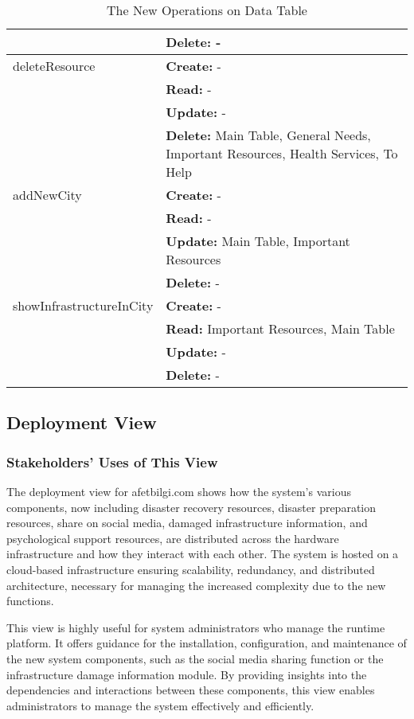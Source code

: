 \documentclass[12pt, letterpaper]{article}
\begin{document}
\begin{table}[H]
\begin{tabularx}{\textwidth}{|X|p{10cm}|}
     & \textbf{Delete:} - \\
\hline
     deleteResource & \textbf{Create:} - \\
     & \textbf{Read:} - \\
     & \textbf{Update:} - \\
     & \textbf{Delete:} Main Table, General Needs, Important Resources, Health Services, To Help \\
\hline
     addNewCity & \textbf{Create:} - \\
     & \textbf{Read:} - \\
     & \textbf{Update:} Main Table, Important Resources \\
     & \textbf{Delete:} - \\
\hline
     showInfrastructureInCity & \textbf{Create:} - \\
     & \textbf{Read:} Important Resources, Main Table \\
     & \textbf{Update:} - \\
     & \textbf{Delete:} - \\
\hline

\end{tabularx}
\caption{The New Operations on Data Table}
\label{tab:opOnData}
\end{table}

\newpage

\subsection{Deployment View}
\subsubsection{Stakeholders' Uses of This View}
The deployment view for afetbilgi.com shows how the system's various components, now including disaster recovery resources, disaster preparation resources, share on social media, damaged infrastructure information, and psychological support resources, are distributed across the hardware infrastructure and how they interact with each other. The system is hosted on a cloud-based infrastructure ensuring scalability, redundancy, and distributed architecture, necessary for managing the increased complexity due to the new functions.

This view is highly useful for system administrators who manage the runtime platform. It offers guidance for the installation, configuration, and maintenance of the new system components, such as the social media sharing function or the infrastructure damage information module. By providing insights into the dependencies and interactions between these components, this view enables administrators to manage the system effectively and efficiently.
\end{document}
